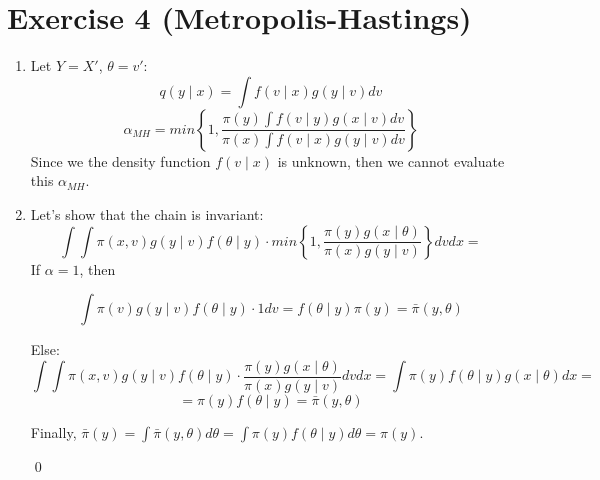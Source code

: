 \documentclass[12pt,letterpaper]{article}
\begin{document}
\newpage
\section*{Exercise 4 (Metropolis-Hastings)}
\begin{enumerate}[leftmargin=!,labelindent=5pt]
\item Let $Y = X'$, $\theta = v'$:
$$q(y \mid x) = \int f(v \mid x) g(y \mid v) dv$$
$$
\alpha_{MH} = min \left \{ 1,
\frac{\pi(y)\int f(v \mid y) g(x \mid v) dv}
{\pi(x)\int f(v \mid x) g(y \mid v) dv}
\right \}
$$
Since we the density function $f(v \mid x)$ is unknown, then we cannot 
evaluate this $\alpha_{MH}$.

\item Let's show that the chain is invariant:
$$
\int \int \pi(x,v) g(y \mid v) f(\theta \mid y)
\cdot min \left \{
1, \frac{\pi(y)g(x \mid \theta)}{\pi(x)g(y\mid v)}
\right\} dv dx = 
$$
If $\alpha =1 $, then

$$
\int \pi(v) g(y \mid v) f(\theta \mid y)
\cdot 1
dv = f(\theta \mid y) \pi(y) = \bar\pi(y, \theta)
$$

Else:
$$
\int \int \pi(x,v) g(y \mid v) f(\theta \mid y)
\cdot 
\frac{\pi(y)g(x \mid \theta)}{\pi(x)g(y\mid v)}
dv dx = 
\int \pi(y) f(\theta \mid y) g(x \mid \theta) dx =
$$
$$
= \pi(y) f(\theta \mid y) = \bar\pi(y, \theta)
$$

Finally, $\bar\pi(y) = \int \bar\pi(y,\theta) d\theta = 
\int \pi(y) f(\theta \mid y) d\theta = \pi(y)$.

\qed



\end{enumerate}
\end{document}
